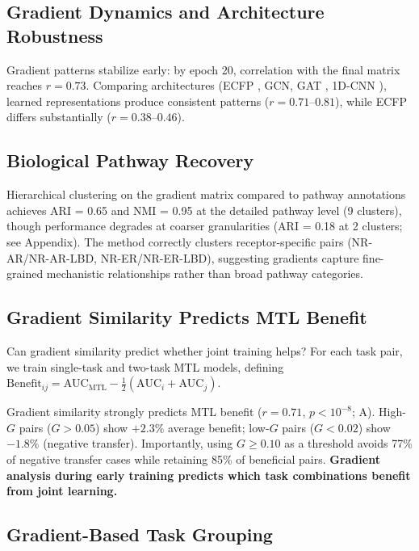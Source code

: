 \documentclass{article}
\begin{document}
\subsection{Gradient Dynamics and Architecture Robustness}
\label{sec:robustness}

Gradient patterns stabilize early: by epoch 20, correlation with the final matrix reaches $r = 0.73$. Comparing architectures (ECFP \citep{rogers2010ecfp}, GCN, GAT \citep{velickovic2018gat}, 1D-CNN \citep{weininger1988smiles}), learned representations produce consistent patterns ($r = 0.71$--$0.81$), while ECFP differs substantially ($r = 0.38$--$0.46$).

\subsection{Biological Pathway Recovery}

Hierarchical clustering on the gradient matrix compared to pathway annotations achieves ARI = 0.65 and NMI = 0.95 at the detailed pathway level (9 clusters), though performance degrades at coarser granularities (ARI = 0.18 at 2 clusters; see Appendix). The method correctly clusters receptor-specific pairs (NR-AR/NR-AR-LBD, NR-ER/NR-ER-LBD), suggesting gradients capture fine-grained mechanistic relationships rather than broad pathway categories.

\subsection{Gradient Similarity Predicts MTL Benefit}

Can gradient similarity predict whether joint training helps? For each task pair, we train single-task and two-task MTL models, defining $\text{Benefit}_{ij} = \text{AUC}_{\text{MTL}} - \frac{1}{2}(\text{AUC}_i + \text{AUC}_j)$.

Gradient similarity strongly predicts MTL benefit ($r = 0.71$, $p < 10^{-8}$; A). High-$G$ pairs ($G > 0.05$) show $+2.3\%$ average benefit; low-$G$ pairs ($G < 0.02$) show $-1.8\%$ (negative transfer). Importantly, using $G \geq 0.10$ as a threshold avoids 77\% of negative transfer cases while retaining 85\% of beneficial pairs. \textbf{Gradient analysis during early training predicts which task combinations benefit from joint learning.}

\subsection{Gradient-Based Task Grouping}
\end{document}
